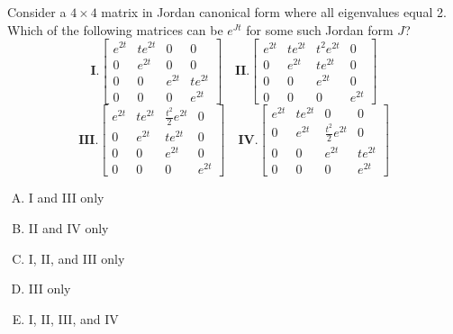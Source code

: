 \documentclass[12pt]{amsart}
\begin{document}
Consider a $4 \times 4$ matrix in Jordan canonical form where all eigenvalues equal 2. Which of the following matrices can be $e^{Jt}$ for some such Jordan form $J$?
\[
\displaystyle
\textbf{I.} \begin{bmatrix} e^{2t} & te^{2t} & 0 & 0 \\ 0 & e^{2t} & 0 & 0 \\ 0 & 0 & e^{2t} & te^{2t} \\ 0 & 0 & 0 & e^{2t} \end{bmatrix}
\quad
\textbf{II.} \begin{bmatrix} e^{2t} & te^{2t} & t^2e^{2t} & 0 \\ 0 & e^{2t} & te^{2t} & 0 \\ 0 & 0 & e^{2t} & 0 \\ 0 & 0 & 0 & e^{2t} \end{bmatrix}
\]
\[
\displaystyle\textbf{III.} \begin{bmatrix} e^{2t} & te^{2t} & \frac{t^2}{2}e^{2t} & 0 \\ 0 & e^{2t} & te^{2t} & 0 \\ 0 & 0 & e^{2t} & 0 \\ 0 & 0 & 0 & e^{2t} \end{bmatrix}
\quad
\textbf{IV.} \begin{bmatrix} e^{2t} & te^{2t} & 0 & 0 \\ 0 & e^{2t} & \frac{t^2}{2}e^{2t} & 0 \\ 0 & 0 & e^{2t} & te^{2t} \\ 0 & 0 & 0 & e^{2t} \end{bmatrix}
\]
\begin{enumerate}[(A)]
\item I and III only
\item II and IV only
\item I, II, and III only
\item III only
\item I, II, III, and IV
\end{enumerate}

\end{document}
